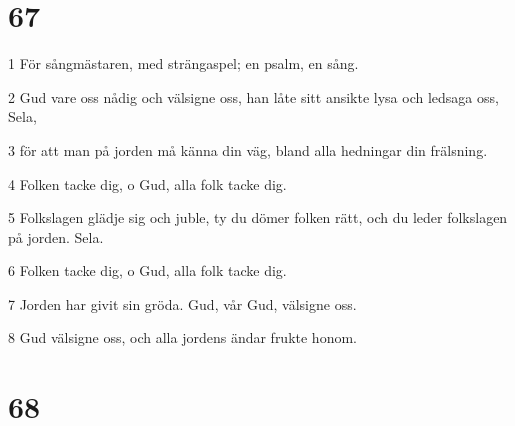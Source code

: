 \chapter{67}

\par 1 För sångmästaren, med strängaspel; en psalm, en sång.
\par 2 Gud vare oss nådig och välsigne oss, han låte sitt ansikte lysa och ledsaga oss, Sela,
\par 3 för att man på jorden må känna din väg, bland alla hedningar din frälsning.
\par 4 Folken tacke dig, o Gud, alla folk tacke dig.
\par 5 Folkslagen glädje sig och juble, ty du dömer folken rätt, och du leder folkslagen på jorden. Sela.
\par 6 Folken tacke dig, o Gud, alla folk tacke dig.
\par 7 Jorden har givit sin gröda. Gud, vår Gud, välsigne oss.
\par 8 Gud välsigne oss, och alla jordens ändar frukte honom.

\chapter{68}


